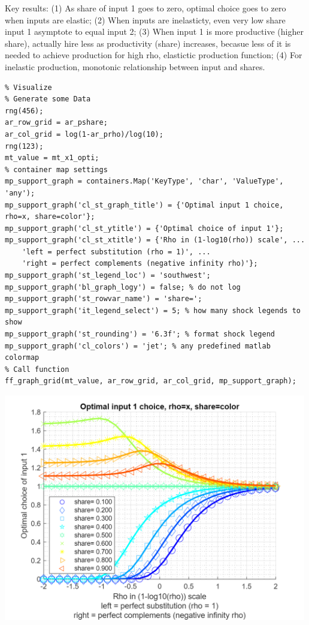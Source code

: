 \documentclass[
]{book}
\begin{document}
Key results: (1) As share of input 1 goes to zero, optimal choice goes
to zero when inputs are elastic; (2) When inputs are inelasticty, even
very low share input 1 asymptote to equal input 2; (3) When input 1 is
more productive (higher share), actually hire less as productivity
(share) increases, becasue less of it is needed to achieve production
for high rho, elastictic production function; (4) For inelastic
production, monotonic relationship between input and shares.

\begin{verbatim}
% Visualize
% Generate some Data
rng(456);
ar_row_grid = ar_pshare;
ar_col_grid = log(1-ar_prho)/log(10);
rng(123);
mt_value = mt_x1_opti;
% container map settings
mp_support_graph = containers.Map('KeyType', 'char', 'ValueType', 'any');
mp_support_graph('cl_st_graph_title') = {'Optimal input 1 choice, rho=x, share=color'};
mp_support_graph('cl_st_ytitle') = {'Optimal choice of input 1'};
mp_support_graph('cl_st_xtitle') = {'Rho in (1-log10(rho)) scale', ...
    'left = perfect substitution (rho = 1)', ...
    'right = perfect complements (negative infinity rho)'};
mp_support_graph('st_legend_loc') = 'southwest';
mp_support_graph('bl_graph_logy') = false; % do not log
mp_support_graph('st_rowvar_name') = 'share=';
mp_support_graph('it_legend_select') = 5; % how many shock legends to show
mp_support_graph('st_rounding') = '6.3f'; % format shock legend
mp_support_graph('cl_colors') = 'jet'; % any predefined matlab colormap
% Call function
ff_graph_grid(mt_value, ar_row_grid, ar_col_grid, mp_support_graph);
\end{verbatim}

\includegraphics[width=5.20833in,height=\textheight]{img/bfwx_crs_nested_ces_images/figure_0.png}
\end{document}
